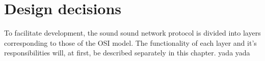 \chapter{Design decisions}

To facilitate development, the sound sound network protocol is divided into layers corresponding to those of the OSI model. The functionality of each layer and it's responsibilities will, at first, be described separately in this chapter. yada yada